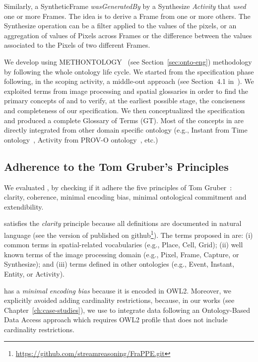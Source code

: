 Similarly, a \textsf{SyntheticFrame} \textit{wasGeneratedBy} by a \textsf{Synthesize} \textit{Activity} that \textit{used} one or more \textsf{Frame}s. The idea is to derive a \textsf{Frame} from one or more others. The \textsf{Synthesize} operation can be a filter applied to the values of the pixels, or an aggregation of values of \textsf{Pixel}s across \textsf{Frame}s or the difference between the values associated to the \textsf{Pixel}s of two different \textsf{Frame}s. 

We develop \frappe{} using METHONTOLOGY~\cite{fernandez1997methontology} (see Section~\ref{sec:onto-eng}) methodology by following the whole ontology life cycle.
We started from the specification phase following, in the scoping activity, a middle-out approach (see Section~4.1 in~\cite{fernandez1997methontology}). We exploited terms from image processing and spatial glossaries in order to find the primary concepts of \frappe{} and to verify, at the earliest possible stage, the conciseness and completeness of our specification. 
We then conceptualized the specification and produced a complete  Glossary of Terms (GT).
Most of the concepts in \frappe{} are directly integrated from other domain specific ontology (e.g., Instant from Time ontology~\cite{Hobbs2006}, Activity from PROV-O ontology~\cite{w3c-prov-o}, etc.)

\subsection{Adherence to the Tom Gruber's Principles} \label{sec:conc-fr-1-eval}
We evaluated \frappe{}, by checking if it adhere the five principles of Tom Gruber~\cite{DBLP:journals/ijmms/Gruber95}: 
clarity, coherence, minimal encoding bias, minimal ontological commitment and extendibility.

\frappe{} satisfies the \textit{clarity} principle because all definitions are documented in natural language (see the version of \frappe{} published on github\footnote{\url{https://github.com/streamreasoning/FraPPE.git}}). The terms proposed in \frappe{} are: (i) common terms in spatial-related vocabularies (e.g., \textsf{Place}, \textsf{Cell}, \textsf{Grid}); (ii) well known terms of the image processing domain (e.g., \textsf{Pixel}, \textsf{Frame}, \textsf{Capture}, or \textsf{Synthesize}); and (iii) terms defined in other ontologies (e.g., Event, Instant, Entity, or Activity). 

\frappe{} has a \textit{minimal encoding bias} because it is encoded in OWL2. Moreover, we explicitly avoided adding cardinality restrictions, because, in our works (see Chapter~\ref{ch:case-studies}), we use \frappe{} to integrate data following an Ontology-Based Data Access approach which requires OWL2 profile that does not include cardinality restrictions.   

